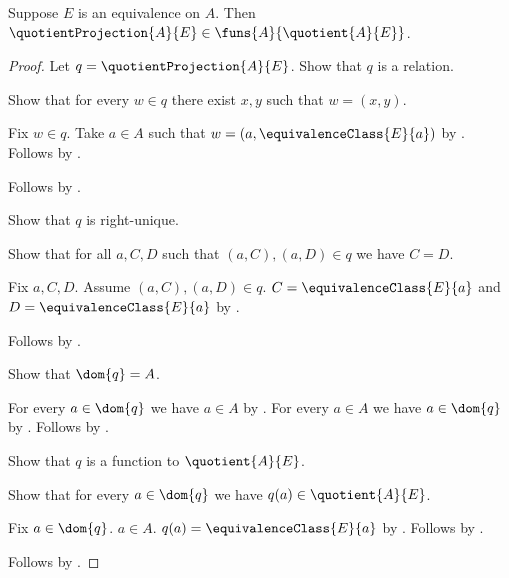 \begin{proposition}\label{quotient_projection_type}
    Suppose $E$ is an equivalence on $A$.
    Then $\quotientProjection{A}{E}\in
        \funs{A}{\quotient{A}{E}}$.
\end{proposition}
\begin{proof}
    Let $q=\quotientProjection{A}{E}$.
    Show that $q$ is a relation.
    \begin{subproof}
        Show that for every $w\in q$ there exist $x,y$ such that
            $w=(x,y)$.
        \begin{subproof}
            Fix $w\in q$.
            Take $a\in A$ such that
                $w=(a,\equivalenceClass{E}{a})$ by
                .
            Follows by \auto.
        \end{subproof}
        Follows by .
    \end{subproof}
    Show that $q$ is right-unique.
    \begin{subproof}
        Show that for all $a,C,D$ such that $(a,C),(a,D)\in q$
            we have $C=D$.
        \begin{subproof}
            Fix $a,C,D$.
            Assume $(a,C),(a,D)\in q$.
            $C=\equivalenceClass{E}{a}$ and
                $D=\equivalenceClass{E}{a}$ by
                .
        \end{subproof}
        Follows by .
    \end{subproof}
    Show that $\dom{q}=A$.
    \begin{subproof}
        For every $a\in\dom{q}$ we have $a\in A$ by
            .
        For every $a\in A$ we have $a\in\dom{q}$ by
            .
        Follows by .
    \end{subproof}
    Show that $q$ is a function to $\quotient{A}{E}$.
    \begin{subproof}
        Show that for every $a\in\dom{q}$ we have
            $q(a)\in\quotient{A}{E}$.
        \begin{subproof}
            Fix $a\in\dom{q}$.
            $a\in A$.
            $q(a)=\equivalenceClass{E}{a}$ by
                .
            Follows by .
        \end{subproof}
    \end{subproof}
    Follows by .
\end{proof}

